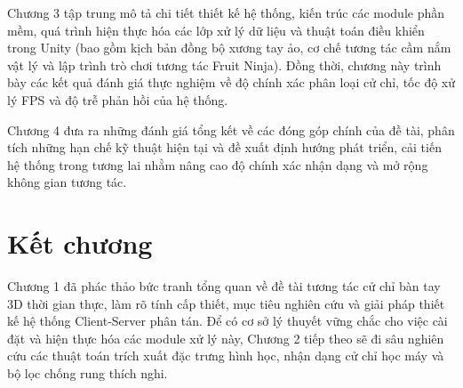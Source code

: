 \documentclass[../BTL.tex]{subfiles}
\begin{document}
Chương 3 tập trung mô tả chi tiết thiết kế hệ thống, kiến trúc các module phần mềm, quá trình hiện thực hóa các lớp xử lý dữ liệu và thuật toán điều khiển trong Unity (bao gồm kịch bản đồng bộ xương tay ảo, cơ chế tương tác cầm nắm vật lý và lập trình trò chơi tương tác Fruit Ninja). Đồng thời, chương này trình bày các kết quả đánh giá thực nghiệm về độ chính xác phân loại cử chỉ, tốc độ xử lý FPS và độ trễ phản hồi của hệ thống.

Chương 4 đưa ra những đánh giá tổng kết về các đóng góp chính của đề tài, phân tích những hạn chế kỹ thuật hiện tại và đề xuất định hướng phát triển, cải tiến hệ thống trong tương lai nhằm nâng cao độ chính xác nhận dạng và mở rộng không gian tương tác.

\section*{Kết chương}
Chương 1 đã phác thảo bức tranh tổng quan về đề tài tương tác cử chỉ bàn tay 3D thời gian thực, làm rõ tính cấp thiết, mục tiêu nghiên cứu và giải pháp thiết kế hệ thống Client-Server phân tán. Để có cơ sở lý thuyết vững chắc cho việc cài đặt và hiện thực hóa các module xử lý này, Chương 2 tiếp theo sẽ đi sâu nghiên cứu các thuật toán trích xuất đặc trưng hình học, nhận dạng cử chỉ học máy và bộ lọc chống rung thích nghi.
\end{document}
